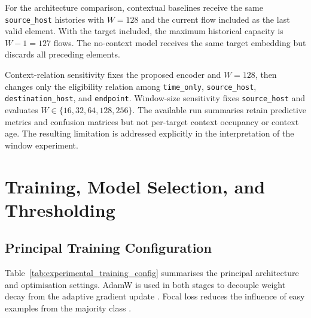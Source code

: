 \documentclass[11pt,fleqn]{report}
\begin{document}
For the architecture comparison, contextual baselines receive the same \texttt{source\_host} histories with $W=128$ and the current flow included as the last valid element. With the target included, the maximum historical capacity is $W-1=127$ flows. The no-context model receives the same target embedding but discards all preceding elements.

Context-relation sensitivity fixes the proposed encoder and $W=128$, then changes only the eligibility relation among \texttt{time\_only}, \texttt{source\_host}, \texttt{destination\_host}, and \texttt{endpoint}. Window-size sensitivity fixes \texttt{source\_host} and evaluates $W\in\{16,32,64,128,256\}$. The available run summaries retain predictive metrics and confusion matrices but not per-target context occupancy or context age. The resulting limitation is addressed explicitly in the interpretation of the window experiment.

\section{Training, Model Selection, and Thresholding}
\label{subsec:experimental_training_protocol}

\subsection{Principal Training Configuration}
\label{subsubsec:principal_training_config}

Table~\ref{tab:experimental_training_config} summarises the principal architecture and optimisation settings. AdamW is used in both stages to decouple weight decay from the adaptive gradient update \cite{Loshchilov2019AdamW}. Focal loss reduces the influence of easy examples from the majority class \cite{Lin2017FocalLoss}.
\end{document}
